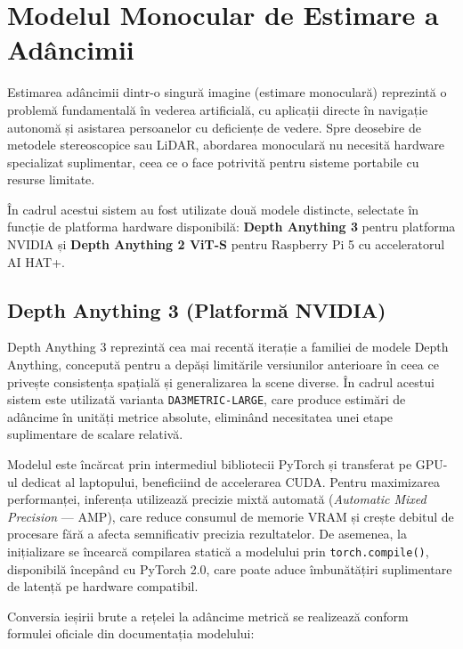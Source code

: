 \section{Modelul Monocular de Estimare a Adâncimii}
\label{sec:ch3sec4}

\par Estimarea adâncimii dintr-o singură imagine (estimare monoculară) reprezintă o problemă fundamentală în vederea artificială, cu aplicații directe în navigație autonomă și asistarea persoanelor cu deficiențe de vedere. Spre deosebire de metodele stereoscopice sau LiDAR, abordarea monoculară nu necesită hardware specializat suplimentar, ceea ce o face potrivită pentru sisteme portabile cu resurse limitate.

\par În cadrul acestui sistem au fost utilizate două modele distincte, selectate în funcție de platforma hardware disponibilă: \textbf{Depth Anything 3} pentru platforma NVIDIA și \textbf{Depth Anything 2 ViT-S} pentru Raspberry Pi 5 cu acceleratorul AI HAT+.

\subsection{Depth Anything 3 (Platformă NVIDIA)}

\par Depth Anything 3 \cite{depthanything3} reprezintă cea mai recentă iterație a familiei de modele Depth Anything, concepută pentru a depăși limitările versiunilor anterioare în ceea ce privește consistența spațială și generalizarea la scene diverse. În cadrul acestui sistem este utilizată varianta \texttt{DA3METRIC-LARGE}, care produce estimări de adâncime în unități metrice absolute, eliminând necesitatea unei etape suplimentare de scalare relativă.

\par Modelul este încărcat prin intermediul bibliotecii PyTorch și transferat pe GPU-ul dedicat al laptopului, beneficiind de accelerarea CUDA. Pentru maximizarea performanței, inferența utilizează precizie mixtă automată (\textit{Automatic Mixed Precision} — AMP), care reduce consumul de memorie VRAM și crește debitul de procesare fără a afecta semnificativ precizia rezultatelor. De asemenea, la inițializare se încearcă compilarea statică a modelului prin \texttt{torch.compile()}, disponibilă începând cu PyTorch 2.0, care poate aduce îmbunătățiri suplimentare de latență pe hardware compatibil.

\par Conversia ieșirii brute a rețelei la adâncime metrică se realizează conform formulei oficiale din documentația modelului:

